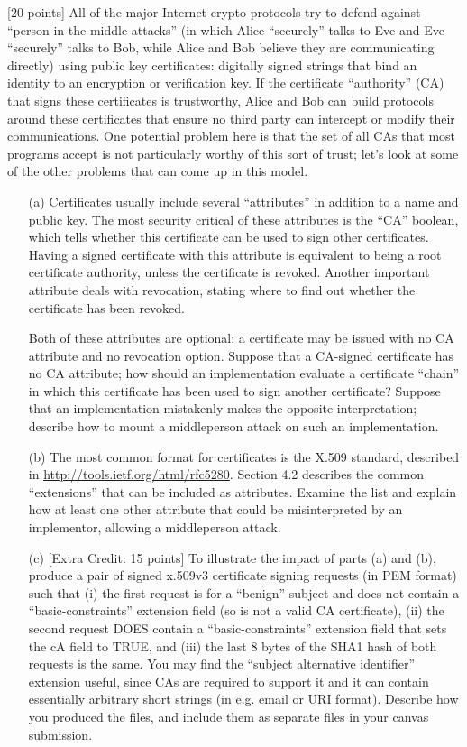 \documentclass[11pt]{article}
\newcounter{qnum}
\newcommand{\question}[1]{\stepcounter{qnum}\bigskip\noindent{\bf \arabic{qnum}. #1.}}
\begin{document}
\question{Middleperson attacks} [20 points] All of the major Internet crypto
protocols try to defend against ``person in the middle attacks'' (in
which Alice ``securely'' talks to Eve and Eve ``securely'' talks to Bob, while Alice and Bob
believe they are communicating directly) using public key
certificates: digitally signed strings that bind an identity to an
encryption or verification key.  If the certificate ``authority'' (CA)
that signs these certificates is trustworthy, Alice and Bob can build
protocols around these certificates that ensure no third party can
intercept or modify their communications.  One potential problem here
is that the set of all CAs that most programs accept is not
particularly worthy of this sort of trust; let's look at some of the
other problems that can come up in this model.
\begin{itemize}
\item[(a)] Certificates usually include several ``attributes'' in
  addition to a name and public key.  The most security critical of
  these attributes is the ``CA'' boolean, which tells whether this
  certificate can be used to sign other certificates.  Having a signed
  certificate with this attribute is equivalent to being a root
  certificate authority, unless the certificate is revoked.  Another
  important attribute deals with revocation, stating where to
  find out whether the certificate has been revoked.

  Both of these attributes are optional: a certificate may be issued
  with no CA attribute and no revocation option.  Suppose that a CA-signed
  certificate has no CA attribute; how should an implementation
  evaluate a certificate ``chain'' in which this certificate has been
  used to sign another certificate?  Suppose that an implementation
  mistakenly makes the opposite interpretation; describe how to mount
  a middleperson attack on such an implementation.

\item[(b)] The most common format for certificates is the X.509 standard, described in
  \url{http://tools.ietf.org/html/rfc5280}.  Section 4.2 describes the
  common ``extensions'' that can be included as attributes.   Examine
  the list and explain how at least one other attribute that could be
  misinterpreted by an implementor, allowing a middleperson attack.

\item[(c)] [Extra Credit: 15 points] To illustrate the impact of parts
  (a) and (b), produce a pair of signed x.509v3 certificate signing requests
  (in PEM format) such that (i) the first request is for a ``benign'' subject and does
  not contain a ``basic-constraints'' extension field (so is not a
  valid CA certificate), (ii) the second request DOES contain a
  ``basic-constraints'' extension field that sets the cA field to
  TRUE, and (iii) the last 8 bytes of the SHA1 hash of both requests
  is the same.  You may find the ``subject alternative identifier''
  extension useful, since CAs are required to support it and it can
  contain essentially arbitrary short strings (in e.g. email or URI
  format).   Describe how you produced the files, and include them as
  separate files in your canvas submission.
\end{itemize}
\end{document}
